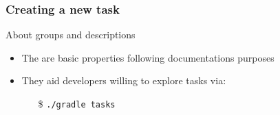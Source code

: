 \documentclass[presentation]{beamer}\mode<presentation>{\usetheme{AMSBolognaFC}}
\begin{document}
\begin{frame}[allowframebreaks]
    \frametitle{Creating a new task}
    

    \begin{block}{About groups and descriptions}
        \begin{itemize}
            \item The are basic properties following documentations purposes
            \item They aid developers willing to explore tasks via:
            \begin{itemize}
                \item[\$] \texttt{./gradle tasks}
            \end{itemize}
        \end{itemize}
    \end{block}

    \framebreak

    

    \framebreak

    

\end{frame}
\end{document}
